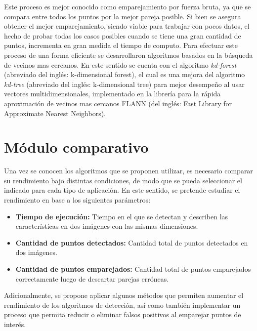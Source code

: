 Este proceso es mejor conocido como emparejamiento por fuerza bruta, ya que se compara entre todos los puntos por la mejor pareja posible. Si bien se asegura obtener el mejor emparejamiento, siendo viable para trabajar con pocos datos, el hecho de probar todas los casos posibles cuando se tiene una gran cantidad de puntos, incrementa en gran medida el tiempo de computo. Para efectuar este proceso de una forma eficiente se desarrollaron algoritmos basados en la búsqueda de vecinos mas cercanos. En este sentido se cuenta con el algoritmo \textit{kd-forest} (abreviado del inglés: k-dimensional forest), el cual es una mejora del algoritmo \textit{kd-tree} (abreviado del inglés: k-dimensional tree) para mejor desempeño al usar vectores multidimensionales, implementado en la librería para la rápida aproximación de vecinos mas cercanos FLANN \cite{flann} (del inglés: Fast Library for Approximate Nearest Neighbors).


\section{Módulo comparativo}

Una vez se conocen los algoritmos que se proponen utilizar, es necesario comparar su rendimiento bajo distintas condiciones, de modo que se pueda seleccionar el indicado para cada tipo de aplicación. En este sentido, se pretende estudiar el rendimiento en base a los siguientes parámetros:

\begin{itemize}
	\item \textbf{Tiempo de ejecución:} Tiempo en el que se detectan y describen las características en dos imágenes con las mismas dimensiones.
	
	\item \textbf{Cantidad de puntos detectados:} Cantidad total de puntos detectados en dos imágenes.
	
	\item \textbf{Cantidad de puntos emparejados:} Cantidad total de puntos emparejados correctamente luego de descartar parejas erróneas. 
\end{itemize}

Adicionalmente, se propone aplicar algunos métodos que permiten aumentar el rendimiento de los algoritmos de detección, así como también implementar un proceso que permita reducir o eliminar falsos positivos al emparejar puntos de interés. 


